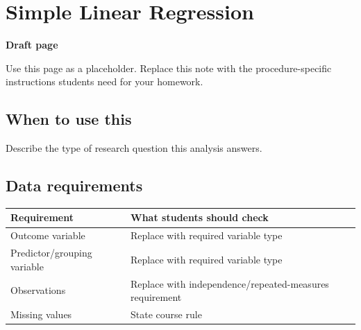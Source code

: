 \documentclass[
  letterpaper,
  DIV=11,
  numbers=noendperiod]{scrreprt}
\newcounter{none} %
\begin{document}
\chapter{Simple Linear Regression}\label{simple-linear-regression}

\begin{tcolorbox}[enhanced jigsaw, arc=.35mm, bottomrule=.15mm, breakable, colback=white, colframe=quarto-callout-note-color-frame, left=2mm, leftrule=.75mm, opacityback=0, rightrule=.15mm, toprule=.15mm]
\begin{minipage}[t]{5.5mm}
\textcolor{quarto-callout-note-color}{\faInfo}
\end{minipage}%
\begin{minipage}[t]{\textwidth - 5.5mm}

\vspace{-3mm}\textbf{Draft page}\vspace{3mm}

Use this page as a placeholder. Replace this note with the
procedure-specific instructions students need for your homework.

\end{minipage}%
\end{tcolorbox}

\section{When to use this}\label{when-to-use-this-9}

Describe the type of research question this analysis answers.

\section{Data requirements}\label{data-requirements-10}

{\def\LTcaptype{none} %
\begin{longtable}[]{@{}
  >{\raggedright\arraybackslash}p{}
  >{\raggedright\arraybackslash}p{}@{}}
\toprule\noalign{}
\begin{minipage}[b]{\linewidth}\raggedright
Requirement
\end{minipage} & \begin{minipage}[b]{\linewidth}\raggedright
What students should check
\end{minipage} \\
\midrule\noalign{}
\endhead
\bottomrule\noalign{}
\endlastfoot
Outcome variable & Replace with required variable type \\
Predictor/grouping variable & Replace with required variable type \\
Observations & Replace with independence/repeated-measures
requirement \\
Missing values & State course rule \\
\end{longtable}
}
\end{document}
